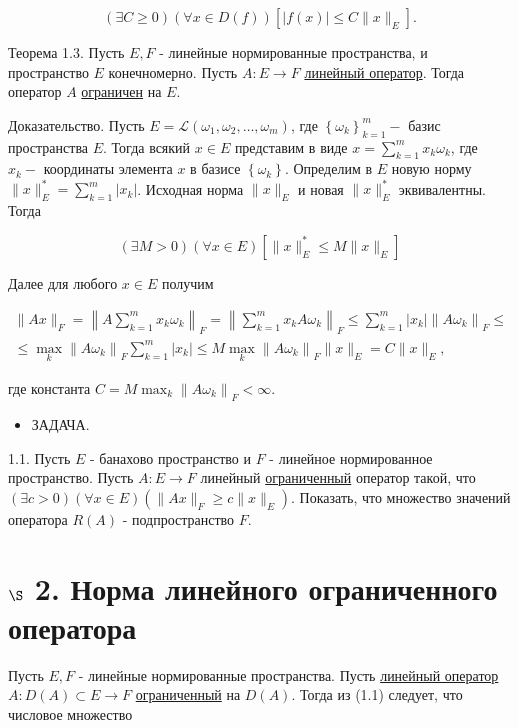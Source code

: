 \documentclass[a4paper, 12pt]{extarticle}
\begin{document}
$$
	(\exists C \geq 0)(\forall x \in D(f))\left[|f(x)| \leq C\|x\|_{E}\right] .
$$

Теорема 1.3. Пусть $E, F$ - линейные нормированные пространства, $и$ пространство $E$ конечномерно. Пусть $A: E \rightarrow F$ \hyperlink{linOperator}{линейный оператор}. Тогда оператор $A$ \hyperlink{ogranichenn}{ограничен} на $E$.

Доказательство. Пусть $E=\mathscr{L}\left(\omega_{1}, \omega_{2}, \ldots, \omega_{m}\right)$, где $\left\{\omega_{k}\right\}_{k=1}^{m}-$ базис пространства $E$. Тогда всякий $x \in E$ представим в виде $x=\sum_{k=1}^{m} x_{k} \omega_{k}$, где $x_{k}-$ координаты элемента $x$ в базисе $\left\{\omega_{k}\right\}$. Определим в $E$ новую норму $\|x\|_{E}^{*}=\sum_{k=1}^{m}\left|x_{k}\right|$. Исходная норма $\|x\|_{E}$ и новая $\|x\|_{E}^{*}$ эквивалентны. Тогда

$$
	(\exists M>0)(\forall x \in E)\left[\|x\|_{E}^{*} \leq M\|x\|_{E}\right]
$$

Далее для любого $x \in E$ получим

$$
	\begin{gathered}
		\|A x\|_{F}=\left\|A \sum_{k=1}^{m} x_{k} \omega_{k}\right\|_{F}=\left\|\sum_{k=1}^{m} x_{k} A \omega_{k}\right\|_{F} \leq \sum_{k=1}^{m}\left|x_{k}\right|\left\|A \omega_{k}\right\|_{F} \leq \\
		\leq \max _{k}\left\|A \omega_{k}\right\|_{F} \sum_{k=1}^{m}\left|x_{k}\right| \leq M \max _{k}\left\|A \omega_{k}\right\|_{F}\|x\|_{E}=C\|x\|_{E},
	\end{gathered}
$$

где константа $C=M \max _{k}\left\|A \omega_{k}\right\|_{F}<\infty$. $~$

\begin{itemize}
	\item ЗАДАЧА.
\end{itemize}

1.1. Пусть $E$ - банахово пространство и $F$ - линейное нормированное пространство. Пусть $A: E \rightarrow F$ линейный \hyperlink{ogranichenn}{ограниченный} оператор такой, что $(\exists c>0)(\forall x \in E)\left(\|A x\|_{F} \geq c\|x\|_{E}\right)$. Показать, что множество значений оператора $R(A)$ - подпространство $F$.

\section*{$\S$ 2. Норма линейного ограниченного оператора}
Пусть $E, F$ - линейные нормированные пространства. Пусть \hyperlink{linOperator}{линейный оператор} $A: D(A) \subset E \rightarrow F$ \hyperlink{ogranichenn}{ограниченный} на $D(A)$. Тогда из (1.1) следует, что числовое множество
\end{document}
